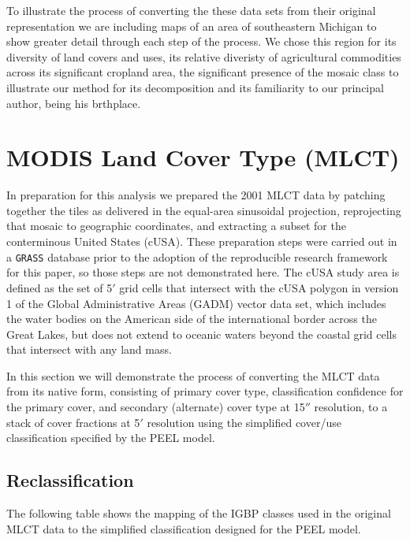 To illustrate the process of converting the these data sets from their
original representation we are including maps of an area of
southeastern Michigan to show greater detail through each step of the
process.  We chose this region for its diversity of land covers and
uses, its relative diveristy of agricultural commodities across its
significant cropland area, the significant presence of the mosaic
class to illustrate our method for its decomposition and its
familiarity to our principal author, being his brthplace.


\section{MODIS Land Cover Type (MLCT)}
\label{sec:mlct}

In preparation for this analysis we prepared the 2001 MLCT data by
patching together the tiles as delivered in the equal-area sinusoidal
projection, reprojecting that mosaic to geographic coordinates, and
extracting a subset for the conterminous United States (cUSA).  These
preparation steps were carried out in a \texttt{GRASS} database prior
to the adoption of the reproducible research framework for this paper,
so those steps are not demonstrated here.  The cUSA study area is
defined as the set of 5$'$ grid cells that intersect with the cUSA
polygon in version 1 of the Global Administrative Areas (GADM) vector
data set, which includes the water bodies on the American side of the
international border across the Great Lakes, but does not extend to
oceanic waters beyond the coastal grid cells that intersect with any
land mass.

In this section we will demonstrate the process of converting the MLCT
data from its native form, consisting of primary cover type,
classification confidence for the primary cover, and secondary
(alternate) cover type at 15$''$ resolution, to a stack of cover
fractions at 5$'$ resolution using the simplified cover/use
classification specified by the PEEL model.

\subsection{Reclassification}
\label{sec:mlct-reclass}

The following table shows the mapping of the IGBP classes used in the
original MLCT data to the simplified classification designed for the
PEEL model.






